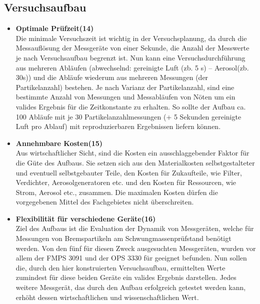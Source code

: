 \subsection{Versuchsaufbau}
\begin{itemize}
\item \textbf{Optimale Pr\"{u}fzeit(14)}\\ 
Die minimale Versuchszeit ist wichtig in der Versuchsplanung, da durch die Messaufl\"{o}sung der Messger\"{a}te von einer Sekunde, die Anzahl der Messwerte je nach Versuchsaufbau begrenzt ist. Nun kann eine Versuchsdurchf\"{u}hrung aus mehreren Abl\"{a}ufen (abwechselnd: gereinigte Luft (zb. 5 s) -- Aerosol(zb. 30s)) und die Abl\"{a}ufe wiederum aus mehreren Messungen (der Partikelanzahl) bestehen. Je nach Varianz der Partikelanzahl, sind eine bestimmte Anzahl von Messungen und Messabl\"{a}ufen von N\"{o}ten um ein valides Ergebnis f\"{u}r die Zeitkonstante zu erhalten. So sollte der Aufbau ca. 100 Abl\"{a}ufe mit je 30 Partikelanzahlmessungen (+ 5 Sekunden gereinigte Luft pro Ablauf) mit reproduzierbaren Ergebnissen liefern k\"{o}nnen.

\item \textbf{Annehmbare Kosten(15)}\\
Aus wirtschaftlicher Sicht, sind die Kosten ein ausschlaggebender Faktor für die G\"{u}te des Aufbaus. Sie setzen sich aus den Materialkosten selbstgestalteter und eventuell selbstgebauter Teile, den Kosten für Zukaufteile, wie Filter, Verdichter, Aerosolgeneratoren etc. und den Kosten f\"{u}r Ressourcen, wie Strom, Aerosol etc., zusammen. Die maximalen Kosten d\"{u}rfen die vorgegebenen Mittel des Fachgebietes nicht \"{u}berschreiten. 

\item \textbf{Flexibilit\"{a}t f\"{u}r verschiedene Ger\"{a}te(16)}\\
Ziel des Aufbaus ist die Evaluation der Dynamik von Messger\"{a}ten, welche f\"{u}r Messungen von Bremspartikeln am Schwungmassenpr\"{u}fstand ben\"{o}tigt werden. Von den f\"{u}nf f\"{u}r diesen Zweck ausgesuchten Messger\"{a}ten, wurden vor allem der FMPS 3091 und der OPS 3330 f\"{u}r geeignet befunden. Nun sollen die, durch den hier konstruierten Versuchsaufbau, ermittelten Werte zumindest f\"{u}r diese beiden Ger\"{a}te ein valides Ergebnis darstellen. Jedes weitere Messger\"{a}t, das durch den Aufbau erfolgreich getestet werden kann, erh\"{o}ht dessen wirtschaftlichen und wissenschaftlichen Wert.
\end{itemize}